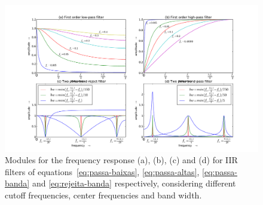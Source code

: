 \documentclass[
 aip,
 jmp,
 amsmath,amssymb,
 reprint,
]{revtex4-1}
\begin{document}
\begin{figure}[h!]
    \centering
        \includegraphics[width=\columnwidth]{figures/iir}
    \caption{Modules for the frequency response (a), (b), (c) and (d) for IIR filters of equations~\ref{eq:passa-baixas}, \ref{eq:passa-altas}, \ref{eq:passa-banda} and \ref{eq:rejeita-banda} respectively, considering different cutoff frequencies, center frequencies and band width.}
        \label{fig:iir}
\end{figure}
\end{document}
